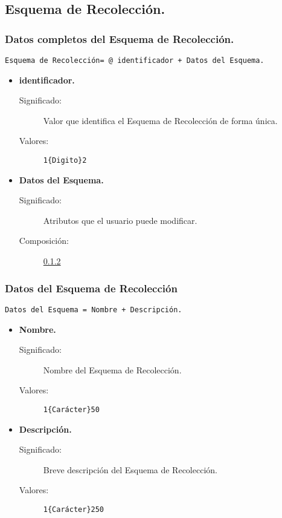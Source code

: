 \subsection{Esquema de Recolección.}

\subsubsection{Datos completos del Esquema de Recolección.}
\begin{lstlisting}
Esquema de Recolección= @ identificador + Datos del Esquema.
\end{lstlisting}
	\begin{itemize}
		\item \textbf{identificador.}
			\begin{description}
				\item [Significado:] Valor que identifica el Esquema de Recolección de forma única.
				\item [Valores:]{\begin{lstlisting}
1{Digito}2\end{lstlisting}}
			\end{description}
		\item \textbf{Datos del Esquema.}
			\begin{description}
				\item [Significado:] Atributos que el usuario puede modificar.
				\item [Composición:] \ref{Datos_EsquemaRecoleccion}
			\end{description}
	\end{itemize}

\subsubsection{Datos del Esquema de Recolección}\label{Datos_EsquemaRecoleccion}
\begin{lstlisting}
Datos del Esquema = Nombre + Descripción.
\end{lstlisting}
	\begin{itemize}
		\item \textbf{Nombre.}
			\begin{description}
				\item [Significado:] Nombre del Esquema de Recolección.
				\item [Valores:]{\begin{lstlisting}
1{Carácter}50\end{lstlisting}}
			\end{description}
		\item \textbf{Descripción.}
			\begin{description}
				\item [Significado:] Breve descripción del Esquema de Recolección.
				\item [Valores:]{\begin{lstlisting}
1{Carácter}250\end{lstlisting}}
			\end{description}
	\end{itemize}

